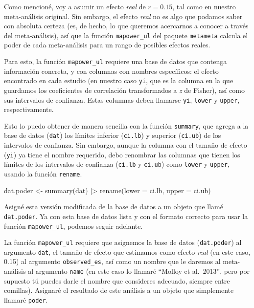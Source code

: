 \documentclass[
  bookmarksnumbered]{article}
\newenvironment{Shaded}{\begin{snugshade}}{\end{snugshade}}
\newcommand{\AttributeTok}[1]{\textcolor[rgb]{0.00,0.34,0.68}{#1}}
\newcommand{\FunctionTok}[1]{\textcolor[rgb]{0.39,0.29,0.61}{#1}}
\newcommand{\NormalTok}[1]{\textcolor[rgb]{0.12,0.11,0.11}{#1}}
\newcommand{\OtherTok}[1]{\textcolor[rgb]{0.00,0.43,0.16}{#1}}
\newcommand{\SpecialCharTok}[1]{\textcolor[rgb]{0.24,0.68,0.91}{#1}}
\begin{document}
Como mencioné, voy a asumir un efecto \emph{real} de \(r = 0.15\), tal como en nuestro meta-análisis original. Sin embargo, el efecto \emph{real} no es algo que podamos saber con absoluta certeza (es, de hecho, lo que queremos acercarnos a conocer a través del meta-análisis), así que la función \texttt{mapower\_ul} del paquete \texttt{metameta} calcula el poder de cada meta-análisis para un rango de posibles efectos reales.

Para esto, la función \texttt{mapower\_ul} requiere una base de datos que contenga información concreta, y con columnas con nombres específicos: el efecto encontrado en cada estudio (en nuestro caso \texttt{yi}, que es la columna en la que guardamos los coeficientes de correlación transformados a \emph{z} de Fisher), así como sus intervalos de confianza. Estas columnas deben llamarse \texttt{yi}, \texttt{lower} y \texttt{upper}, respectivamente.

Esto lo puedo obtener de manera sencilla con la función \texttt{summary}, que agrega a la base de datos (\texttt{dat}) los límites inferior (\texttt{ci.lb}) y superior (\texttt{ci.ub}) de los intervalos de confianza. Sin embargo, aunque la columna con el tamaño de efecto (\texttt{yi}) ya tiene el nombre requerido, debo renombrar las columnas que tienen los límites de los intervalos de confianza (\texttt{ci.lb} y \texttt{ci.ub}) como \texttt{lower} y \texttt{upper}, usando la función \texttt{rename}.

\begin{Shaded}
\begin{Highlighting}[]
\NormalTok{dat.poder }\OtherTok{\textless{}{-}} \FunctionTok{summary}\NormalTok{(dat) }\SpecialCharTok{|\textgreater{}}
  \FunctionTok{rename}\NormalTok{(}\AttributeTok{lower =}\NormalTok{ ci.lb, }\AttributeTok{upper =}\NormalTok{ ci.ub)}
\end{Highlighting}
\end{Shaded}

Asigné esta versión modificada de la base de datos a un objeto que llamé \texttt{dat.poder}. Ya con esta base de datos lista y con el formato correcto para usar la función \texttt{mapower\_ul}, podemos seguir adelante.

La función \texttt{mapower\_ul} requiere que asignemos la base de datos (\texttt{dat.poder}) al argumento \texttt{dat}, el tamaño de efecto que estimamos como efecto \emph{real} (en este caso, 0.15) al argumento \texttt{observed\_es}, así como un nombre que le daremos al meta-análisis al argumento \texttt{name} (en este caso lo llamaré ``Molloy et al.~2013'', pero por supuesto tú puedes darle el nombre que consideres adecuado, siempre entre comillas). Asignaré el resultado de este análisis a un objeto que simplemente llamaré \texttt{poder}.
\end{document}
